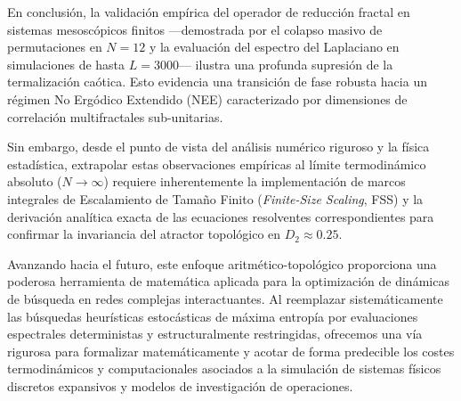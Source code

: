 \documentclass[sn-mathphys]{sn-jnl}
\begin{document}
En conclusión, la validación empírica del operador de reducción fractal en sistemas mesoscópicos finitos —demostrada por el colapso masivo de permutaciones en $N=12$ y la evaluación del espectro del Laplaciano en simulaciones de hasta $L=3000$— ilustra una profunda supresión de la termalización caótica. Esto evidencia una transición de fase robusta hacia un régimen No Ergódico Extendido (NEE) caracterizado por dimensiones de correlación multifractales sub-unitarias.

Sin embargo, desde el punto de vista del análisis numérico riguroso y la física estadística, extrapolar estas observaciones empíricas al límite termodinámico absoluto ($N \to \infty$) requiere inherentemente la implementación de marcos integrales de Escalamiento de Tamaño Finito (\textit{Finite-Size Scaling}, FSS) y la derivación analítica exacta de las ecuaciones resolventes correspondientes para confirmar la invariancia del atractor topológico en $D_2 \approx 0.25$. 

Avanzando hacia el futuro, este enfoque aritmético-topológico proporciona una poderosa herramienta de matemática aplicada para la optimización de dinámicas de búsqueda en redes complejas interactuantes. Al reemplazar sistemáticamente las búsquedas heurísticas estocásticas de máxima entropía por evaluaciones espectrales deterministas y estructuralmente restringidas, ofrecemos una vía rigurosa para formalizar matemáticamente y acotar de forma predecible los costes termodinámicos y computacionales asociados a la simulación de sistemas físicos discretos expansivos y modelos de investigación de operaciones.

\end{document}
